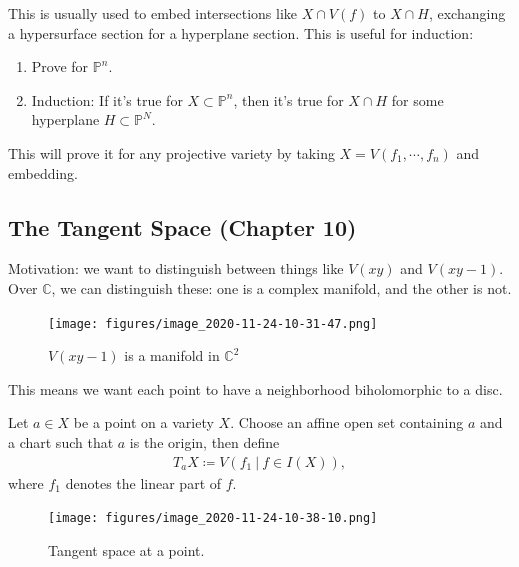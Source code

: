 \begin{remark}

This is usually used to embed intersections like \(X\cap V(f)\) to
\(X\cap H\), exchanging a hypersurface section for a hyperplane section.
This is useful for induction:

\begin{enumerate}
\def\labelenumi{\arabic{enumi}.}
\tightlist
\item
  Prove for \({\mathbb{P}}^n\).
\item
  Induction: If it's true for \(X \subset{\mathbb{P}}^n\), then it's
  true for \(X \cap H\) for some hyperplane \(H \subset{\mathbb{P}}^N\).
\end{enumerate}

This will prove it for any projective variety by taking
\(X = V(f_1, \cdots, f_n)\) and embedding.

\end{remark}

\hypertarget{the-tangent-space-chapter-10}{%
\subsection{The Tangent Space (Chapter
10)}\label{the-tangent-space-chapter-10}}

Motivation: we want to distinguish between things like \(V(xy)\) and
\(V(xy-1)\). Over \({\mathbb{C}}\), we can distinguish these: one is a
complex manifold, and the other is not.

\begin{figure}
\centering
\texttt{[image: figures/image\_2020-11-24-10-31-47.png]}
\caption{\(V(xy-1)\) is a manifold in \({\mathbb{C}}^2\)}
\end{figure}

This means we want each point to have a neighborhood biholomorphic to a
disc.

\begin{definition}

Let \(a\in X\) be a point on a variety \(X\). Choose an affine open set
containing \(a\) and a chart such that \(a\) is the origin, then define
\begin{align*}  
T_a X \coloneqq V(f_1 {~\mathrel{\Big|}~}f\in I(X))
,\end{align*}
where \(f_1\) denotes the linear part of \(f\).

\begin{figure}
\centering
\texttt{[image: figures/image\_2020-11-24-10-38-10.png]}
\caption{Tangent space at a point.}
\end{figure}

\end{definition}

